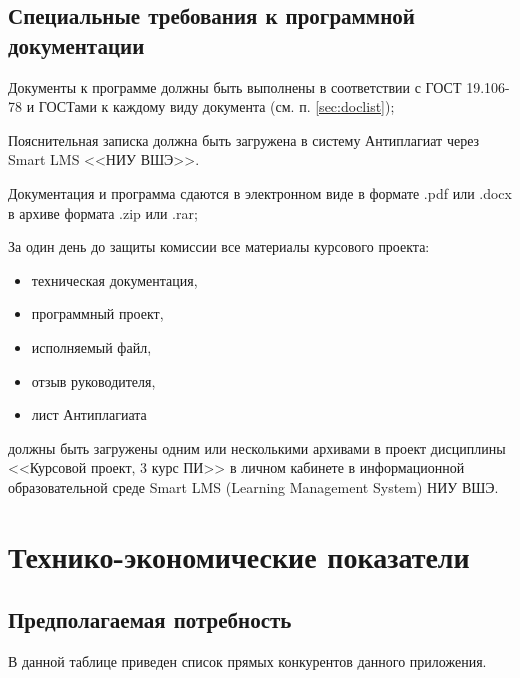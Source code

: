 \documentclass[a4paper,12pt,reqno]{article}
\begin{document}
  \subsection{Специальные требования к программной документации}
  \label{sec:smartlms}
  Документы к программе должны быть выполнены в соответствии с ГОСТ 19.106-78 и ГОСТами к каждому виду документа (см. п. \ref{sec:doclist});

  Пояснительная записка должна быть загружена в систему Антиплагиат через Smart LMS <<НИУ ВШЭ>>.

  Документация и программа сдаются в электронном виде в формате .pdf или .docx в архиве формата .zip или .rar;

  За один день до защиты комиссии все материалы курсового проекта:
  \begin{itemize}
    \item техническая документация,
    \item программный проект,
    \item исполняемый файл,
    \item отзыв руководителя,
    \item лист Антиплагиата
  \end{itemize}
  должны быть загружены одним или несколькими архивами в проект дисциплины <<Курсовой проект, 3 курс ПИ>> в личном кабинете в информационной образовательной среде Smart LMS (Learning Management System) НИУ ВШЭ.


  \newpage
  \section{Технико-экономические показатели}
  \subsection{Предполагаемая потребность}
  В данной таблице приведен список прямых конкурентов данного приложения.
\end{document}
